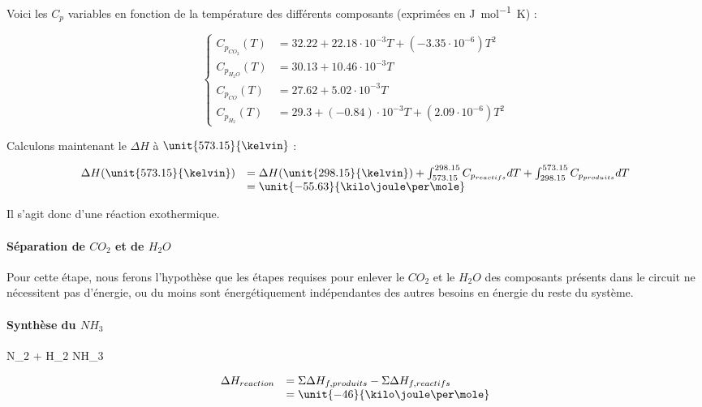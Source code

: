 Voici les $C_p$ variables en fonction de la température des différents composants\cite{hc-table}
(exprimées en \unit{\joule\per\mole\kelvin}) :

$$
	\left\{
		\begin{array}{rl}
			C_{p_{CO_{2}}}(T) &= 32.22 + 22.18\cdot10^{-3}T + (-3.35\cdot10^{-6})T^2\\
			C_{p_{H_2O}}(T)		&= 30.13 + 10.46\cdot10^{-3}T \\
			C_{p_{CO}}(T) 		&= 27.62 + 5.02\cdot10^{-3}T \\
			C_{p_{H_2}}(T) 		&= 29.3 + (-0.84)\cdot10^{-3}T + (2.09\cdot10^{-6})T^2
		\end{array}
	\right.
$$
					
Calculons maintenant le $\Delta H$ à $\unit{573.15}{\kelvin}$ :			

$$
	\begin{array}{rl}
		 	 \Delta H(\unit{573.15}{\kelvin})	&=  \Delta H(\unit{298.15}{\kelvin}) 
				+ \int_{573.15}^{298.15} C_{p_{reactifs}} dT + \int_{298.15}^{573.15} C_{p_{produits}} dT \\
				&=  \unit{-55.63}{\kilo\joule\per\mole}
	\end{array}
$$	
	
Il s'agit donc d'une réaction exothermique.

\paragraph{Séparation de $CO_{2}$ et de $H_{2}O$}		
Pour cette étape, nous ferons l'hypothèse que les étapes requises pour enlever le $CO_{2}$ et le $H_{2}O$ 
des composants présents dans le circuit ne nécessitent pas d'énergie, ou du moins sont énergétiquement indépendantes 
des autres besoins en énergie du reste du système.

\paragraph{Synthèse du $NH_{3}$} 
\begin{chemmath}
		N_{2} + H_2 \Longrightarrow NH_3 
\end{chemmath}	

$$
	\begin{array}{rl}
	\Delta H_{reaction}		&= \Sigma \Delta H_{f,produits} - \Sigma \Delta H_{f,reactifs} \\
												&= \unit{-46}{\kilo\joule\per\mole}
	\end{array}
$$

